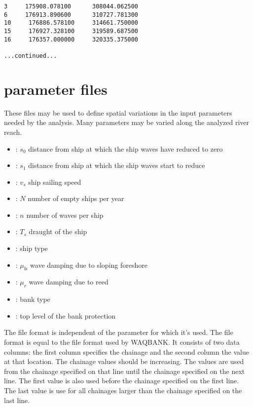 \begin{Verbatim}
3     175908.078100      308044.062500
6     176913.890600      310727.781300
10     176886.578100     314661.750000
15     176927.328100     319589.687500
16     176357.000000     320335.375000 

...continued...
\end{Verbatim}

\section{parameter files} \label{Sec:parfile}

These files may be used to define spatial variations in the input parameters needed by the analysis.
Many parameters may be varied along the analyzed river reach.

\begin{itemize}
\item {}: $s_0$ distance from ship at which the ship waves have reduced to zero 
\item {}: $s_1$ distance from ship at which the ship waves start to reduce 
\item {}: $v_s$ ship sailing speed 
\item {}: $N$ number of empty ships per year 
\item {}: $n$ number of waves per ship \unitbrackets{-}
\item {}: $T_s$ draught of the ship 
\item {}: ship type \unitbrackets{-}
\item {}: $\mu_\text{fs}$ wave damping due to sloping foreshore 
\item {}: $\mu_r$ wave damping due to reed 
\item {}: bank type \unitbrackets{-}
\item {}: top level of the bank protection 
\end{itemize}

The file format is independent of the parameter for which it's used.
The file format is equal to the file format used by WAQBANK.
It consists of two data columns: the first column specifies the chainage and the second column the value at that location.
The chainage values should be increasing.
The values are used from the chainage specified on that line until the chainage specified on the next line.
The first value is also used before the chainage specified on the first line.
The last value is use for all chainages larger than the chainage specified on the last line.

